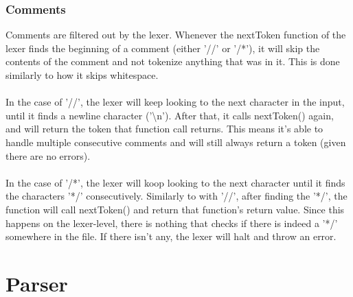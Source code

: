 \documentclass[10pt,a4paper]{article}
\begin{document}
\subsubsection{Comments}
Comments are filtered out by the lexer. Whenever the nextToken function of the lexer finds the beginning of a comment (either '//' or '/*'), it will skip the contents of the comment and not tokenize anything that was in it. This is done similarly to how it skips whitespace. \\
\\
In the case of '//', the lexer will keep looking to the next character in the input, until it finds a newline character ('\textbackslash n'). After that, it calls nextToken() again, and will return the token that function call returns. This means it's able to handle multiple consecutive comments and will still always return a token (given there are no errors).\\
\\
In the case of '/*', the lexer will koop looking to the next character until it finds the characters '*/' consecutively. Similarly to with '//', after finding the '*/', the function will call nextToken() and return that function's return value. Since this happens on the lexer-level, there is nothing that checks if there is indeed a '*/' somewhere in the file. If there isn't any, the lexer will halt and throw an error.



\section{Parser}
\end{document}
